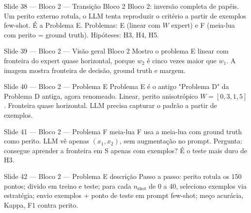 \documentclass[aspectratio=169,10pt]{beamer}
\begin{document}
\begin{frame}{Slide 38 --- Bloco 2 --- Transi\c{c}\~ao Bloco 2}
\footnotesize
Bloco 2: invers\~ao completa de pap\'eis. Um perito externo rotula, o LLM tenta reproduzir o crit\'erio a partir de exemplos few-shot. \'E a Problema E. Problemas: E (linear com $W$ expert) e F (meia-lua com perito = ground truth). Hip\'oteses: H3, H4, H5.
\end{frame}

\begin{frame}{Slide 39 --- Bloco 2 --- Vis\~ao geral Bloco 2}
\footnotesize
Mostro o problema E linear com fronteira do expert quase horizontal, porque $w_2$ \'e cinco vezes maior que $w_1$. A imagem mostra fronteira de decis\~ao, ground truth e margem.
\end{frame}

\begin{frame}{Slide 40 --- Bloco 2 --- Problema E}
\footnotesize
Problema E \'e o antigo "Problema D" da Problema D antiga, agora renomeado. Linear, perito anisotr\'opico $W=[0{,}3, 1{,}5]$. Fronteira quase horizontal. LLM precisa capturar o padr\~ao a partir de exemplos.
\end{frame}

\begin{frame}{Slide 41 --- Bloco 2 --- Problema F meia-lua}
\footnotesize
F usa a meia-lua com ground truth como perito. LLM v\^e apenas $(x_1, x_2)$, sem augmenta\c{c}\~ao no prompt. Pergunta: consegue aprender a fronteira em S apenas com exemplos? \'E o teste mais duro de H3.
\end{frame}

\begin{frame}{Slide 42 --- Bloco 2 --- Problema E descri\c{c}\~ao}
\footnotesize
Passo a passo: perito rotula os 150 pontos; divido em treino e teste; para cada $n_{\text{shot}}$ de 0 a 40, seleciono exemplos via estrat\'egia; envio exemplos + ponto de teste em prompt few-shot; me\c{c}o acur\'acia, Kappa, F1 contra perito.
\end{frame}
\end{document}
